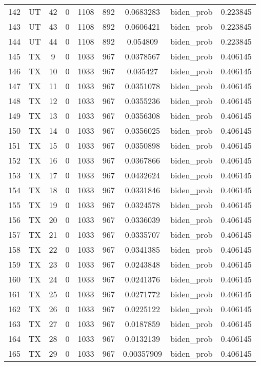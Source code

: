 \documentclass[12pt,a4paper]{article}
\begin{document}
\begin{tabular}{r|cccccccc}
	142 & UT & 42 & 0 & 1108 & 892 & 0.0683283 & biden\_prob & 0.223845 \\
	143 & UT & 43 & 0 & 1108 & 892 & 0.0606421 & biden\_prob & 0.223845 \\
	144 & UT & 44 & 0 & 1108 & 892 & 0.054809 & biden\_prob & 0.223845 \\
	145 & TX & 9 & 0 & 1033 & 967 & 0.0378567 & biden\_prob & 0.406145 \\
	146 & TX & 10 & 0 & 1033 & 967 & 0.035427 & biden\_prob & 0.406145 \\
	147 & TX & 11 & 0 & 1033 & 967 & 0.0351078 & biden\_prob & 0.406145 \\
	148 & TX & 12 & 0 & 1033 & 967 & 0.0355236 & biden\_prob & 0.406145 \\
	149 & TX & 13 & 0 & 1033 & 967 & 0.0356308 & biden\_prob & 0.406145 \\
	150 & TX & 14 & 0 & 1033 & 967 & 0.0356025 & biden\_prob & 0.406145 \\
	151 & TX & 15 & 0 & 1033 & 967 & 0.0350898 & biden\_prob & 0.406145 \\
	152 & TX & 16 & 0 & 1033 & 967 & 0.0367866 & biden\_prob & 0.406145 \\
	153 & TX & 17 & 0 & 1033 & 967 & 0.0432624 & biden\_prob & 0.406145 \\
	154 & TX & 18 & 0 & 1033 & 967 & 0.0331846 & biden\_prob & 0.406145 \\
	155 & TX & 19 & 0 & 1033 & 967 & 0.0324578 & biden\_prob & 0.406145 \\
	156 & TX & 20 & 0 & 1033 & 967 & 0.0336039 & biden\_prob & 0.406145 \\
	157 & TX & 21 & 0 & 1033 & 967 & 0.0335707 & biden\_prob & 0.406145 \\
	158 & TX & 22 & 0 & 1033 & 967 & 0.0341385 & biden\_prob & 0.406145 \\
	159 & TX & 23 & 0 & 1033 & 967 & 0.0243848 & biden\_prob & 0.406145 \\
	160 & TX & 24 & 0 & 1033 & 967 & 0.0241376 & biden\_prob & 0.406145 \\
	161 & TX & 25 & 0 & 1033 & 967 & 0.0271772 & biden\_prob & 0.406145 \\
	162 & TX & 26 & 0 & 1033 & 967 & 0.0225122 & biden\_prob & 0.406145 \\
	163 & TX & 27 & 0 & 1033 & 967 & 0.0187859 & biden\_prob & 0.406145 \\
	164 & TX & 28 & 0 & 1033 & 967 & 0.0132139 & biden\_prob & 0.406145 \\
	165 & TX & 29 & 0 & 1033 & 967 & 0.00357909 & biden\_prob & 0.406145 \\

\end{tabular}
\end{document}

